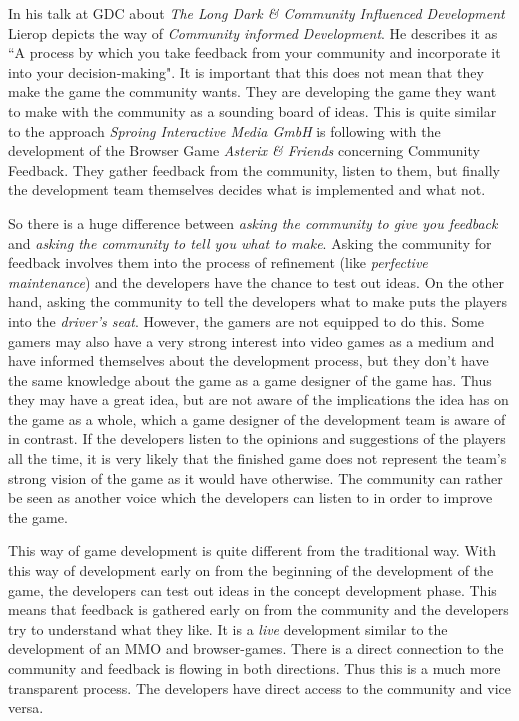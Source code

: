 In his talk \citep{lierop_community_2015} at GDC about \textit{The Long Dark \& Community Influenced Development} Lierop depicts the way of \textit{Community informed Development}. He describes it as \textquotedblleft A process by which you take feedback from your community and incorporate it into your decision-making"\citep{lierop_community_2015}. It is important that this does not mean that they make the game the community wants. They are developing the game they want to make with the community as a sounding board of ideas.\citep{lierop_community_2015} This is quite similar to the approach \textit{Sproing Interactive Media GmbH} is following with the development of the Browser Game \textit{Asterix \& Friends} concerning Community Feedback. They gather feedback from the community, listen to them, but finally the development team themselves decides what is implemented and what not.\citep{seibert_interview_2016}

So there is a huge difference between \textit{asking the community to give you feedback} and \textit{asking the community to tell you what to make}. Asking the community for feedback involves them into the process of refinement (like \textit{perfective maintenance}) and the developers have the chance to test out ideas. On the other hand, asking the community to tell the developers what to make puts the players into the \textit{driver's seat}. However, the gamers are not equipped to do this.\citep{lierop_community_2015} Some gamers may also have a very strong interest into video games as a medium and have informed themselves about the development process, but they don't have the same knowledge about the game as a game designer of the game has. Thus they may have a great idea, but are not aware of the implications the idea has on the game as a whole, which a game designer of the development team is aware of in contrast.\citep{seibert_interview_2016} If the developers listen to the opinions and suggestions of the players all the time, it is very likely that the finished game does not represent the team's strong vision of the game as it would have otherwise. The community can rather be seen as another voice which the developers can listen to in order to improve the game.\citep{lierop_community_2015}

This way of game development is quite different from the traditional way. With this way of development early on from the beginning of the development of the game, the developers can test out ideas in the concept development phase. This means that feedback is gathered early on from the community and the developers try to understand what they like. It is a \textit{live} development similar to the development of an MMO and browser-games. There is a direct connection to the community and feedback is flowing in both directions. Thus this is a much more transparent process. The developers have direct access to the community and vice versa.\citep{lierop_community_2015}

